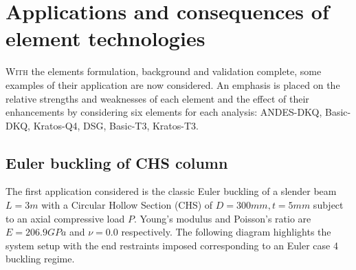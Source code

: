 



\chapter{Applications and consequences of element technologies}
\label{chap:chapter_application}

\renewcommand{\Thema}{Applications and consequences of element technologies}

\lettrine[lines=2]{W}{ith} the elements formulation, background and validation complete, some examples of their application are now considered. An emphasis is placed on the relative strengths and weaknesses of each element and the effect of their enhancements by considering six elements for each analysis: ANDES-DKQ, Basic-DKQ, Kratos-Q4, DSG, Basic-T3, Kratos-T3.

\section{Euler buckling of CHS column}
\label{applications: Euler buckling of CHS column}
The first application considered is the classic Euler buckling of a slender beam $L=3m$ with a Circular Hollow Section (CHS) of $D = 300mm, t = 5mm$ subject to an axial compressive load $P$. Young's modulus and Poisson's ratio are $E = 206.9GPa$ and $\nu = 0.0$ respectively. The following diagram highlights the system setup with the end restraints imposed corresponding to an Euler case 4 buckling regime. 


